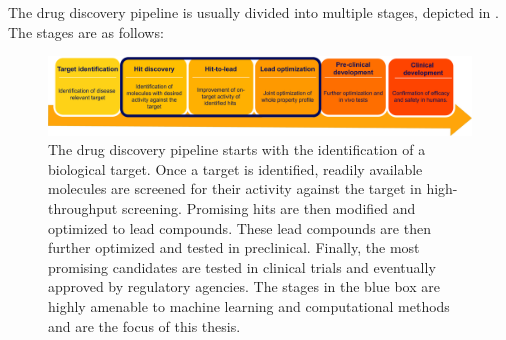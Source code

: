 The drug discovery pipeline is usually divided into multiple stages, depicted in
. The stages are as follows:
\begin{figure}
    \centering
    \includegraphics[width=\textwidth]{figures/drug-discovery-pipeline.pdf}
    \caption{The drug discovery pipeline starts with the identification of a
    biological target. Once a target is identified, readily available molecules
    are screened for their activity against the target in high-throughput
    screening. Promising hits are then modified and optimized to lead compounds.
    These lead compounds are then further optimized and tested in preclinical.
    Finally, the most promising candidates are tested in clinical trials and
    eventually approved by regulatory agencies. The stages in the blue box are
    highly amenable to machine learning and computational methods and are the
    focus of this thesis. \label{fig:drug-discovery-pipeline}}
\end{figure}
